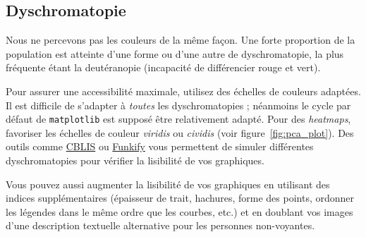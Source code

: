 

\subsection{Dyschromatopie}
Nous ne percevons pas les couleurs de la même façon. Une forte proportion de la population est atteinte d'une forme ou d'une autre de dyschromatopie, la plus fréquente étant la deutéranopie (incapacité de différencier rouge et vert). 

Pour assurer une accessibilité maximale, utilisez des échelles de couleurs
adaptées. Il est difficile de s'adapter à \textit{toutes} les dyschromatopies ;
néanmoins le cycle par défaut de \texttt{matplotlib} est supposé être
relativement adapté. Pour des \textit{heatmaps}, favoriser les échelles de
couleur \textit{viridis} ou \textit{cividis} (voir
figure~\ref{fig:pca_plot}). Des outils comme \href{https://www.color-blindness.com/coblis-color-blindness-simulator/}{CBLIS} ou \href{https://www.funkify.org}{Funkify} vous permettent de simuler différentes dyschromatopies pour vérifier la lisibilité de vos graphiques.

Vous pouvez aussi augmenter la lisibilité de vos graphiques en utilisant des
indices supplémentaires (épaisseur de trait, hachures, forme des points,
ordonner les légendes dans le même ordre que les courbes, etc.) et en doublant
vos images d'une description textuelle alternative pour les personnes
non-voyantes.


